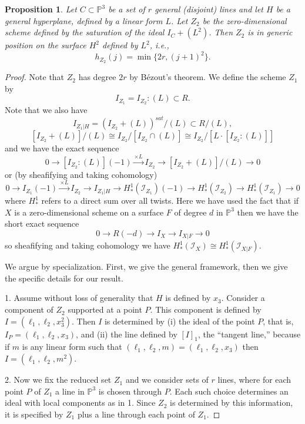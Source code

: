 \documentclass[10pt,a4paper]{amsart}
\newtheorem{proposition}{Proposition}
\newcommand{\PP}{ \ensuremath{\mathbb{P}}}
\begin{document}
\begin{proposition} \label{Z2}
Let $C \subset \PP^3$ be a set of $r$ general (disjoint) lines and let $H$ be a general hyperplane, defined by a linear form $L$. Let $Z_2$ be the zero-dimensional scheme defined by the saturation of the ideal $I_C + (L^2)$. Then $Z_2$ is in generic position on the surface $H^2$ defined by $L^2$, {i.e., 
\[
h_{Z_2} (j) = \min \{ 2r, (j+1)^2\}. 
\]
}
\end{proposition}

\begin{proof} 
Note that $Z_2$ has degree $2r$ by B\'ezout's theorem. We define the scheme $Z_1$ by
\[
I_{Z_1}  =  I_{Z_2} : (L) \subset R.
\]
Note that we also have 
\[
I_{Z_1 |H}  =  (I_{Z_2} + (L))^{sat}/(L) \subset R/(L) ,
\]
\[
 [I_{Z_2} + (L)]/(L) \cong I_{Z_2} / [I_{Z_2} \cap (L)] \cong  I_{Z_2} / [L \cdot [I_{Z_2} : (L) ]]
\]
and we have the exact sequence
\[
0 \rightarrow [I_{Z_2} : (L)](-1) \stackrel{\times L}{\longrightarrow} I_{Z_2} \rightarrow [I_{Z_2} + (L)]/(L) \rightarrow 0
\]
or (by sheafifying and taking cohomology)
\begin{equation} \label{usual exact seq}
0 \rightarrow I_{Z_1}(-1) \stackrel{\times L}{\longrightarrow} I_{Z_2} \rightarrow I_{Z_1 |H} \rightarrow H^1_*(\mathcal I_{Z_1})(-1) \rightarrow H^1_* (\mathcal I_{Z_2}) \rightarrow H^1_* (\mathcal I_{Z_1}) \rightarrow 0
\end{equation}
where $H^1_*$ refers to a direct sum over all twists. Here we have used the fact that if $X$ is a zero-dimensional scheme on a surface $F$ of degree $d$  in $\PP^3$ then we have the short exact sequence
\[
0 \rightarrow R(-d) \rightarrow I_X \rightarrow I_{X|F} \rightarrow 0
\]
so sheafifying and taking cohomology we have $H^1_*(\mathcal I_X) \cong H^1_*(\mathcal I_{X|F})$.



We argue by specialization. First, we give the general framework, then we give the specific details for our result.

1. Assume without loss of generality that $H$ is defined by $x_3$. Consider a component of $Z_2$ supported at a point $P$. This  component is defined by $I = (\ell_1, \ell_2, x_3^2)$. Then $I$ is determined by (i) the ideal of the point $P$, that is, $I_P = (\ell_1, \ell_2, x_3)$, and (ii) the line defined by $[I]_1$, the “tangent line,” because if $m$ is any linear form such that $(\ell_1, \ell_2, m) = (\ell_1, \ell_2, x_3)$ then 
$I = (\ell_1, \ell_2, m^2)$. 

2. Now we fix the reduced set $Z_1$ and we consider sets of $r$ lines, where for each point $P$ of $Z_1$ a line in $\mathbb P^3$ is chosen through $P$. Each such choice determines an ideal with local components as in 1. 
 Since $Z_2$ is determined by this information, it is specified by $Z_1$ plus a line through each point of $Z_1$.


\end{proof}
\end{document}
